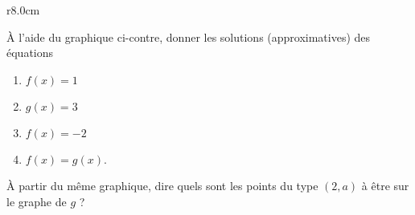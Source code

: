 
\begin{exercice}\label{exoSeconde-0070}

\begin{wrapfigure}{r}{8.0cm}
   \vspace{-0.5cm}        %
   \centering
   
\end{wrapfigure}

        À l'aide du graphique ci-contre, donner les solutions (approximatives) des équations
        \begin{enumerate}
            \item
                \( f(x)=1\)
            \item
                \( g(x)=3\)
            \item
                \( f(x)=-2\)
            \item
                $f(x)=g(x)$.
        \end{enumerate}

        À partir du même graphique, dire quels sont les points du type \( (2,a)\) à être sur le graphe de \( g\) ?

\end{exercice}
